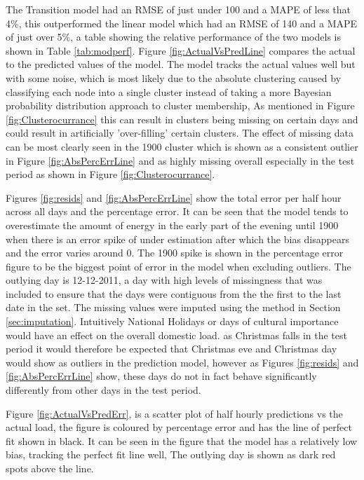 The Transition model had an RMSE of just under 100 and a MAPE of less that 4\%, this outperformed the linear model which had an RMSE of 140 and a MAPE of just over 5\%, a table showing the relative performance of the two models is shown in Table \ref{tab:modperf}. Figure \ref{fig:ActualVsPredLine} compares the actual to the predicted values of the model. The model tracks the actual values well but with some noise, which is most likely due to the absolute clustering caused by classifying each node into a single cluster instead of taking a more Bayesian probability distribution approach to cluster membership, As mentioned in Figure \ref{fig:Clusterocurrance} this can result in clusters being missing on certain days and could result in artificially 'over-filling' certain clusters. The effect of missing data can be most clearly seen in the 1900 cluster which is shown as a consistent outlier in Figure \ref{fig:AbsPercErrLine} and as highly missing overall especially in the test period as shown in Figure \ref{fig:Clusterocurrance}. 

Figures \ref{fig:resids} and \ref{fig:AbsPercErrLine} show the total error per half hour across all days and the percentage error. It can be seen that the model tends to overestimate the amount of energy in the early part of the evening until 1900 when there is an error spike of under estimation after which the bias disappears and the error varies around 0. The 1900 spike is shown in the percentage error figure to be the biggest point of error in the model when excluding outliers. The outlying day is 12-12-2011, a day with high levels of missingness that was included to ensure that the days were contiguous from the the first to the last date in the set. The missing values were imputed using the method in Section \ref{sec:imputation}. 
Intuitively National Holidays or days of cultural importance would have an effect on the overall domestic load. as Christmas falls in the test period it would therefore be expected that Christmas eve and Christmas day would show as outliers in the prediction model, however as Figures \ref{fig:resids} and \ref{fig:AbsPercErrLine} show, these days do not in fact behave significantly differently from other days in the test period.

Figure \ref{fig:ActualVsPredErr}, is a scatter plot of half hourly predictions vs the actual load, the figure is coloured by percentage error and has the line of perfect fit shown in black. It can be seen in the figure that the model has a relatively low bias, tracking the perfect fit line well, The outlying day is shown as dark red spots above the line.

